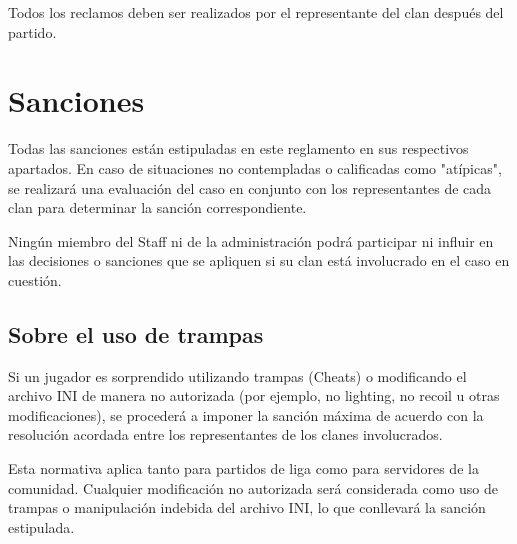 \documentclass[a4paper, 11pt]{article}
\begin{document}
    Todos los reclamos deben ser realizados por el representante del clan después del partido.

    \clearpage

    \section{Sanciones}
    Todas las sanciones están estipuladas en este reglamento en sus respectivos apartados. En caso de situaciones no contempladas o calificadas como "atípicas", se realizará una evaluación del caso en conjunto con los representantes de cada clan para determinar la sanción correspondiente.

    Ningún miembro del Staff ni de la administración podrá participar ni influir en las decisiones o sanciones que se apliquen si su clan está involucrado en el caso en cuestión.

    \subsection{Sobre el uso de trampas}
    Si un jugador es sorprendido utilizando trampas (Cheats) o modificando el archivo INI de manera no autorizada (por ejemplo, no lighting, no recoil u otras modificaciones), se procederá a imponer la sanción máxima de acuerdo con la resolución acordada entre los representantes de los clanes involucrados.

    Esta normativa aplica tanto para partidos de liga como para servidores de la comunidad. Cualquier modificación no autorizada será considerada como uso de trampas o manipulación indebida del archivo INI, lo que conllevará la sanción estipulada.
\end{document}
